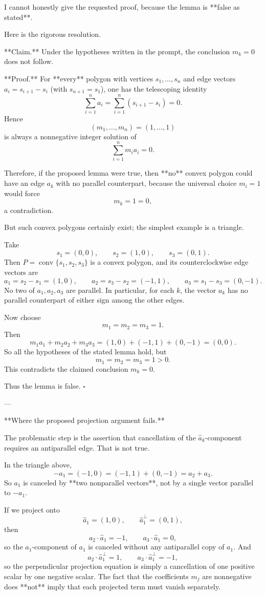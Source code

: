 I cannot honestly give the requested proof, because the lemma is **false as stated**.

Here is the rigorous resolution.

**Claim.** Under the hypotheses written in the prompt, the conclusion \(m_k=0\) does not follow.

**Proof.** For **every** polygon with vertices \(s_1,\dots,s_n\) and edge vectors \(a_i=s_{i+1}-s_i\) (with \(s_{n+1}=s_1\)), one has the telescoping identity
\[
\sum_{i=1}^n a_i
=
\sum_{i=1}^n (s_{i+1}-s_i)
=
0.
\]
Hence
\[
(m_1,\dots,m_n)=(1,\dots,1)
\]
is always a nonnegative integer solution of
\[
\sum_{i=1}^n m_i a_i=0.
\]

Therefore, if the proposed lemma were true, then **no** convex polygon could have an edge \(a_k\) with no parallel counterpart, because the universal choice \(m_i=1\) would force
\[
m_k=1=0,
\]
a contradiction.

But such convex polygons certainly exist; the simplest example is a triangle.

Take
\[
s_1=(0,0),\qquad s_2=(1,0),\qquad s_3=(0,1).
\]
Then \(P=\operatorname{conv}\{s_1,s_2,s_3\}\) is a convex polygon, and its counterclockwise edge vectors are
\[
a_1=s_2-s_1=(1,0),\qquad
a_2=s_3-s_2=(-1,1),\qquad
a_3=s_1-s_3=(0,-1).
\]
No two of \(a_1,a_2,a_3\) are parallel. In particular, for each \(k\), the vector \(a_k\) has no parallel counterpart of either sign among the other edges.

Now choose
\[
m_1=m_2=m_3=1.
\]
Then
\[
m_1a_1+m_2a_2+m_3a_3
=
(1,0)+(-1,1)+(0,-1)
=
(0,0).
\]
So all the hypotheses of the stated lemma hold, but
\[
m_1=m_2=m_3=1>0.
\]
This contradicts the claimed conclusion \(m_k=0\).

Thus the lemma is false. \(\square\)

---

**Where the proposed projection argument fails.**

The problematic step is the assertion that cancellation of the \( \hat a_k \)-component requires an antiparallel edge. That is not true.

In the triangle above,
\[
-a_1=(-1,0)=(-1,1)+(0,-1)=a_2+a_3.
\]
So \(a_1\) is canceled by **two nonparallel vectors**, not by a single vector parallel to \(-a_1\).

If we project onto
\[
\hat a_1=(1,0),\qquad \hat a_1^\perp=(0,1),
\]
then
\[
a_2\cdot \hat a_1=-1,\qquad a_3\cdot \hat a_1=0,
\]
so the \( \hat a_1 \)-component of \(a_1\) is canceled without any antiparallel copy of \(a_1\). And
\[
a_2\cdot \hat a_1^\perp=1,\qquad a_3\cdot \hat a_1^\perp=-1,
\]
so the perpendicular projection equation is simply a cancellation of one positive scalar by one negative scalar. The fact that the coefficients \(m_j\) are nonnegative does **not** imply that each projected term must vanish separately.

